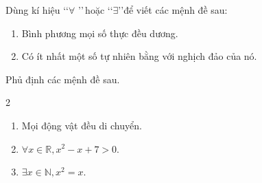\begin{bt}%
	Dùng kí hiệu \lq\lq$\forall$ \rq\rq\,hoặc \lq\lq$\exists$\rq\rq để viết các mệnh đề sau:
	\begin{enumerate}
		\item Bình phương mọi số thực đều dương.
		\item Có ít nhất một số tự nhiên bằng với nghịch đảo của nó.
	\end{enumerate}
\end{bt}

\begin{bt}%
	Phủ định các mệnh đề sau.
	\begin{multicols}{2}
		\begin{enumerate}
			\item Mọi động vật đều di chuyển.
			\item $\forall x\in \mathbb{R}, x^2-x+7>0$.
			\item $\exists x\in \mathbb{N}, x^2=x$.
		\end{enumerate}
	\end{multicols}
	
\end{bt}

